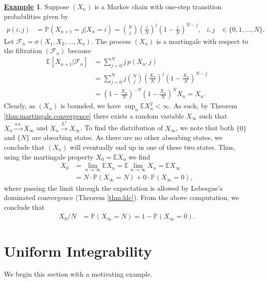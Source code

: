 \documentclass[12pt]{book}
\numberwithin{equation}{chapter}
\theoremstyle{plain}
\numberwithin{theorem}{section}
\theoremstyle{definition}
\newtheorem{example}[theorem]{\underline{Example}}
\numberwithin{exercise}{chapter}
\newcommand{\<}{\langle}
\renewcommand{\>}{\rangle}
\renewcommand{\(}{\left(}
\renewcommand{\)}{\right)}
\renewcommand{\[}{\left[}
\renewcommand{\]}{\right]}
\newcommand\Eb{\mathds{E}}
\newcommand\Pb{\mathds{P}}
\newcommand\Fc{\mathscr{F}}
\newcommand\sig{\sigma}
\begin{document}
\begin{example}
Suppose $(X_n)$ is a Markov chain with one-step transition probabilities given by
\begin{align}
p(i,j)
	&=	\Pb( X_{n+1} = j | X_n = i)
	=		\binom{N}{j} \( \frac{i}{N} \)^j \( 1 - \frac{i}{N} \)^{N-j} , &
i,j
	&\in \{0,1,\ldots,N\} .
\end{align}
Let $\Fc_n = \sig(X_1,X_2,\ldots,X_n)$.  The process $(X_n)$ is a martingale with respect to the filtration $(\Fc_n)$ because
\begin{align}
\Eb[ X_{n+1} | \Fc_n ]
	&=	\sum_{j=0}^N j \,  p(X_n,j) \\
	&=	\sum_{j=0}^N j \binom{N}{j} \( \frac{X_n}{N} \)^j \( 1 - \frac{X_n}{N} \)^{N-j} \\
	&=	\( 1 - \frac{X_n}{N} \)^{-N} \( 1 - \frac{X_n}{N} \)^N X_n
	=		X_n .
\end{align}
Clearly, as $(X_n)$ is bounded, we have $\sup_n \Eb X_n^2 < \infty$.  As such, by Theorem \ref{thm:martingale.convergence} there exists a random variable $X_\infty$ such that $X_n \stackrel{\text{a.s.}}{\to} X_\infty$ and $X_n \stackrel{L^2}{\to} X_\infty$.
To find the distribution of $X_\infty$, we note that both $\{0\}$ and $\{N\}$ are absorbing states.  As there are no other absorbing states, we conclude that $(X_n)$ will eventually end up in one of these two states.  Thus, using the martingale property $X_0 = \Eb X_n$ we find
\begin{align}
X_0
	&=	\lim_{n \to \infty} \Eb X_n
	=		\Eb \lim_{n \to \infty} X_n 
	=		\Eb X_\infty \\
	&=	N \cdot \Pb( X_\infty = N ) + 0 \cdot \Pb( X_\infty = 0 ) ,
\end{align}
where passing the limit through the expectation is allowed by Lebesgue's dominated convergence (Theorem \ref{thm:ldc}).  From the above computation, we conclude that
\begin{align}
X_0/N 
	&=	\Pb( X_\infty = N ) =  1 - \Pb( X_\infty = 0 ) .
\end{align}
\end{example}



\section{Uniform Integrability}
\label{sec:ui}
We begin this section with a motivating example.
\end{document}
